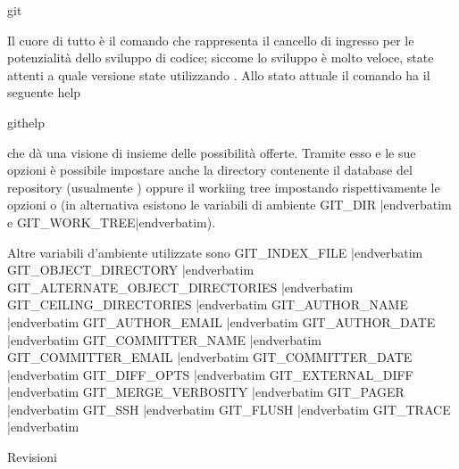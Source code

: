 \sezione git

Il cuore di tutto \`e il comando  che rappresenta il cancello di
ingresso per le potenzialit\`a dello sviluppo di codice; siccome lo sviluppo \`e
molto veloce, state attenti a quale versione state utilizzando \gitversion. Allo
stato attuale il comando ha il seguente help

 githelp

che d\`a una visione di insieme
delle possibilit\`a offerte. Tramite esso e le
sue opzioni \`e possibile impostare anche la directory contenente il database
del repository (usualmente ) oppure il workiing tree impostando
rispettivamente le opzioni  o  (in
alternativa esistono le variabili di ambiente \verbatim GIT_DIR |endverbatim e
\verbatim GIT_WORK_TREE|endverbatim).

Altre variabili d'ambiente utilizzate sono
\unorderedlist
\li\verbatim GIT_INDEX_FILE |endverbatim
\li\verbatim GIT_OBJECT_DIRECTORY |endverbatim
\li\verbatim GIT_ALTERNATE_OBJECT_DIRECTORIES |endverbatim
\li\verbatim GIT_CEILING_DIRECTORIES |endverbatim
\li\verbatim GIT_AUTHOR_NAME |endverbatim
\li\verbatim GIT_AUTHOR_EMAIL |endverbatim
\li\verbatim GIT_AUTHOR_DATE |endverbatim
\li\verbatim GIT_COMMITTER_NAME |endverbatim
\li\verbatim GIT_COMMITTER_EMAIL |endverbatim
\li\verbatim GIT_COMMITTER_DATE |endverbatim
\li\verbatim GIT_DIFF_OPTS |endverbatim
\li\verbatim GIT_EXTERNAL_DIFF |endverbatim
\li\verbatim GIT_MERGE_VERBOSITY |endverbatim
\li\verbatim GIT_PAGER |endverbatim
\li\verbatim GIT_SSH |endverbatim
\li\verbatim GIT_FLUSH |endverbatim
\li\verbatim GIT_TRACE |endverbatim
\endunorderedlist

\sezione Revisioni

